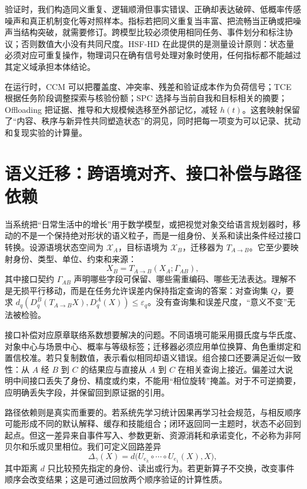 验证时，我们构造同义重复、逻辑顺滑但事实错误、正确却表达破碎、低概率传感噪声和真正机制变化等对照样本。指标若把同义重复当丰富、把流畅当正确或把噪声当结构突破，就需要修订。跨模型比较必须使用相同任务、事件划分和标注协议；否则数值大小没有共同尺度。HSF-HD 在此提供的是测量设计原则：状态量必须对应可重复操作，物理词只在确有信号处理对象时使用，任何指标都不能越过其定义域承担本体结论。

在运行时，CCM 可以把覆盖度、冲突率、残差和验证成本作为负荷信号；TCE 根据任务阶段调整探索与核验份额；SPC 选择与当前自我和目标相关的摘要；Offloading 把证据、推导和大规模候选移至外部记忆，减轻 $h(t)$。这套映射保留了“内容、秩序与新异性共同塑造状态”的洞见，同时把每一项变为可以记录、扰动和复现实验的计算量。

\section{语义迁移：跨语境对齐、接口补偿与路径依赖}
\label{sec:geometric_transport}

当系统把“日常生活中的增长”用于数学模型，或把视觉对象交给语言规划器时，移动的不是一个保持绝对形状的语义粒子，而是一组身份、关系和读出条件经过接口转换。设源语境状态空间为 $\mathcal X_A$，目标语境为 $\mathcal X_B$，迁移器为 $T_{A\to B}$。它至少要映射身份、类型、单位、约束和来源：
\begin{equation}
 X_B=T_{A\to B}(X_A;\Gamma_{AB}),
\end{equation}
其中接口契约 $\Gamma_{AB}$ 声明哪些字段可保留、哪些需重编码、哪些无法表达。理解不是无损平行移动，而是在任务允许误差内保持指定查询的答案：对查询集 $Q$，要求 $d_q(D_q^B(T_{A\to B}X),D_q^A(X))\leq\varepsilon_q$。没有查询集和误差尺度，“意义不变”无法被检验。

接口补偿对应原章联络系数想要解决的问题。不同语境可能采用摄氏度与华氏度、对象中心与场景中心、概率与等级标签；迁移器必须应用单位换算、角色重绑定和置信校准。若只复制数值，表示看似相同却语义错误。组合接口还要满足近似一致性：从 $A$ 经 $B$ 到 $C$ 的结果应与直接从 $A$ 到 $C$ 在相关查询上接近。偏差过大说明中间接口丢失了身份、精度或约束，不能用“相位旋转”掩盖。对于不可逆摘要，应明确丢失字段，并保留回到原证据的引用。

路径依赖则是真实而重要的。若系统先学习统计因果再学习社会规范，与相反顺序可能形成不同的默认解释、缓存和技能组合；闭环返回同一主题时，状态不必回到起点。但这一差异来自事件写入、参数更新、资源消耗和承诺变化，不必称为非阿贝尔和乐或贝里相位。我们可定义回路差异
\begin{equation}
 \Delta_\gamma(X)=d\bigl(U_{e_k}\circ\cdots\circ U_{e_1}(X),X\bigr),
\end{equation}
其中距离 $d$ 只比较预先指定的身份、读出或行为。若更新算子不交换，改变事件顺序会改变结果；这是可通过回放两个顺序验证的计算性质。

